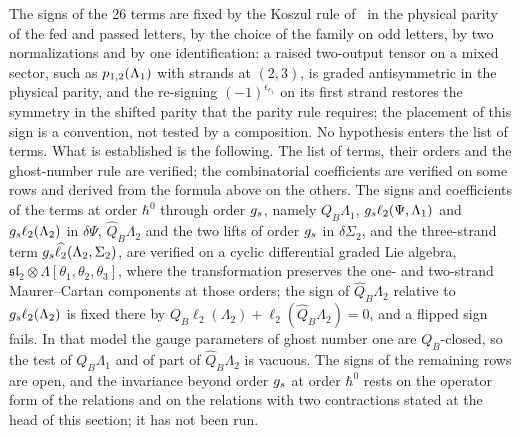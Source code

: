 The signs of the 26 terms are fixed by the Koszul rule of~\cite[(2.1)]{Cieliebak:2015:HomologicalAlgebraRelated} in the physical parity of the fed and passed letters, by the choice of the family on odd letters, by two normalizations and by one identification: a raised two-output tensor on a mixed sector, such as $p_{1,2}(\Lambda_1)$ with strands at $(2, 3)$, is graded antisymmetric in the physical parity, and the re-signing $(-1)^{\epsilon_{c_1}}$ on its first strand restores the symmetry in the shifted parity that the parity rule requires; the placement of this sign is a convention, not tested by a composition.
No hypothesis enters the list of terms.
What is established is the following.
The list of terms, their orders and the ghost-number rule are verified; the combinatorial coefficients are verified on some rows and derived from the formula above on the others.
The signs and coefficients of the terms at order $\hbar^0$ through order $g_s$, namely $Q_B \Lambda_1$, $g_s \ell_2(\Psi, \Lambda_1)$ and $g_s \ell_2(\Lambda_2)$ in $\delta \Psi$, $\hat{Q}_B \Lambda_2$ and the two lifts of order $g_s$ in $\delta \Sigma_2$, and the three-strand term $g_s \widehat{\ell_2}(\Lambda_2, \Sigma_2)$, are verified on a cyclic differential graded Lie algebra, $\mathfrak{sl}_2 \otimes \Lambda[\theta_1, \theta_2, \theta_3]$, where the transformation preserves the one- and two-strand Maurer--Cartan components at those orders; the sign of $\hat{Q}_B \Lambda_2$ relative to $g_s \ell_2(\Lambda_2)$ is fixed there by $Q_B \ell_2(\Lambda_2) + \ell_2(\hat{Q}_B \Lambda_2) = 0$, and a flipped sign fails.
In that model the gauge parameters of ghost number one are $Q_B$-closed, so the test of $Q_B \Lambda_1$ and of part of $\hat{Q}_B \Lambda_2$ is vacuous.
The signs of the remaining rows are open, and the invariance beyond order $g_s$ at order $\hbar^0$ rests on the operator form of the relations and on the relations with two contractions stated at the head of this section; it has not been run.
